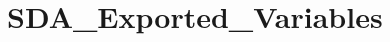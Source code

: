 \hypertarget{group___s_d_a___exported___variables}{}\section{S\+D\+A\+\_\+\+Exported\+\_\+\+Variables}
\label{group___s_d_a___exported___variables}
